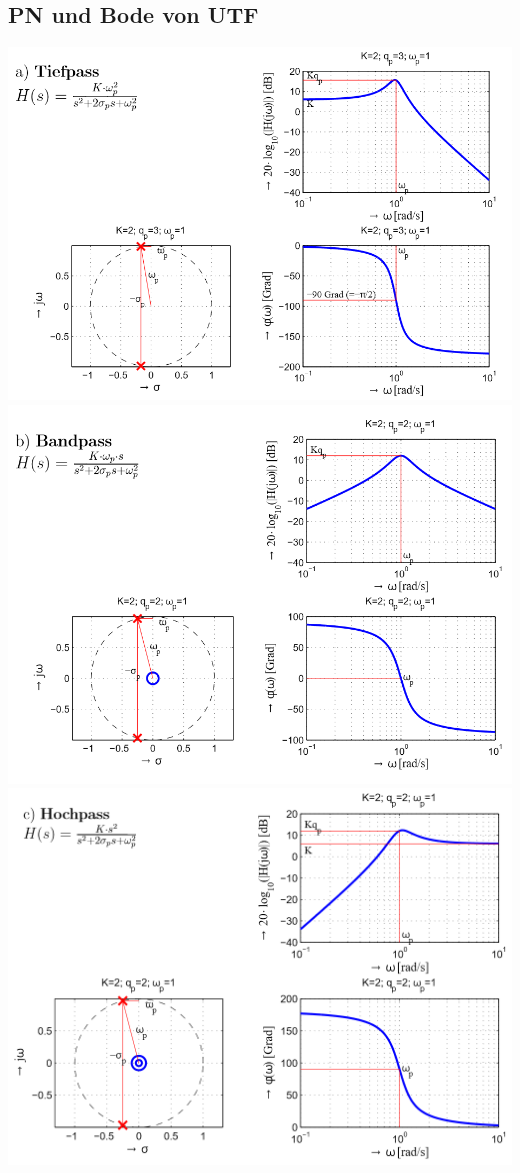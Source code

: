 \subsection{PN und Bode von UTF}\label{pn}
\begin{center}
\includegraphics[width=0.8\columnwidth]{Images/tiefpass}\\
\includegraphics[width=0.8\columnwidth]{Images/bandpass}\\
\includegraphics[width=0.8\columnwidth]{Images/hochpass}\\

\end{center}
